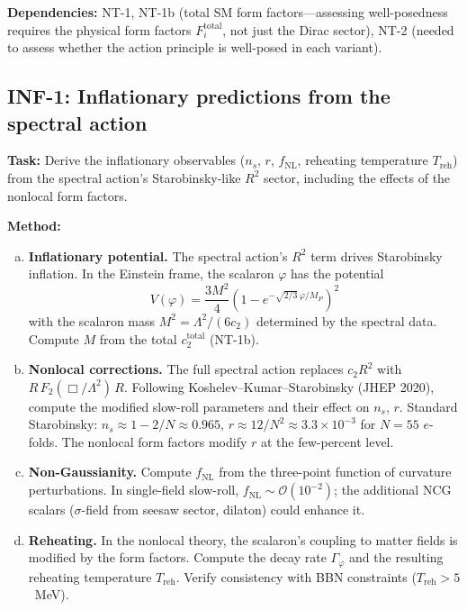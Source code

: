 \documentclass[12pt,a4paper]{article}
\newcommand{\task}[1]{\noindent\textbf{Task:} #1\par}
\newcommand{\method}[1]{\noindent\textbf{Method:} #1\par}
\newcommand{\deps}[1]{\noindent\textbf{Dependencies:} #1\par}
\begin{document}
\deps{NT-1, NT-1b (total SM form factors---assessing well-posedness requires
the physical form factors $F_i^{\text{total}}$, not just the Dirac sector),
NT-2 (needed to assess whether the action principle is well-posed
in each variant).}

\subsection{INF-1: Inflationary predictions from the spectral action}
\label{task:INF1}

\task{Derive the inflationary observables ($n_s$, $r$, $f_{\text{NL}}$,
reheating temperature $T_{\text{reh}}$) from the spectral action's
Starobinsky-like $R^2$ sector, including the effects of the nonlocal
form factors.}

\method{
\begin{enumerate}[(a)]
  \item \textbf{Inflationary potential.} The spectral action's $R^2$ term
    drives Starobinsky inflation. In the Einstein frame, the scalaron
    $\varphi$ has the potential
    \begin{equation}
      V(\varphi) = \frac{3M^2}{4}\left(1 - e^{-\sqrt{2/3}\,\varphi/M_P}\right)^2
    \end{equation}
    with the scalaron mass $M^2 = \Lambda^2/(6 c_2)$ determined by the
    spectral data. Compute $M$ from the total $c_2^{\text{total}}$ (NT-1b).
  \item \textbf{Nonlocal corrections.} The full spectral action replaces
    $c_2 R^2$ with $R\,F_2(\Box/\Lambda^2)\,R$. Following
    Koshelev--Kumar--Starobinsky (JHEP 2020), compute the modified
    slow-roll parameters and their effect on $n_s$, $r$.
    Standard Starobinsky: $n_s \approx 1 - 2/N \approx 0.965$,
    $r \approx 12/N^2 \approx 3.3 \times 10^{-3}$ for $N = 55$ $e$-folds.
    The nonlocal form factors modify $r$ at the few-percent level.
  \item \textbf{Non-Gaussianity.} Compute $f_{\text{NL}}$ from the
    three-point function of curvature perturbations. In single-field
    slow-roll, $f_{\text{NL}} \sim \mathcal{O}(10^{-2})$; the additional
    NCG scalars ($\sigma$-field from seesaw sector, dilaton) could enhance it.
  \item \textbf{Reheating.} In the nonlocal theory, the scalaron's coupling
    to matter fields is modified by the form factors. Compute the decay rate
    $\Gamma_\varphi$ and the resulting reheating temperature $T_{\text{reh}}$.
    Verify consistency with BBN constraints ($T_{\text{reh}} > 5$~MeV).

\end{enumerate}}
\end{document}
